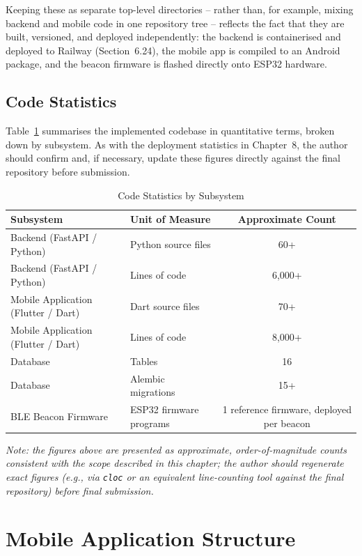 \documentclass[12pt, a4paper, oneside]{report}
\begin{document}
Keeping these as separate top-level directories -- rather than, for example, mixing backend and mobile code in one repository tree -- reflects the fact that they are built, versioned, and deployed independently: the backend is containerised and deployed to Railway (Section~6.24), the mobile app is compiled to an Android package, and the beacon firmware is flashed directly onto ESP32 hardware.

\subsection{Code Statistics}
\label{sec:code-stats}

Table~\ref{tab:code-stats} summarises the implemented codebase in quantitative terms, broken down by subsystem. As with the deployment statistics in Chapter~8, the author should confirm and, if necessary, update these figures directly against the final repository before submission.

\begin{table}[htbp]
\centering
\caption{Code Statistics by Subsystem}
\label{tab:code-stats}
\begin{tabularx}{\textwidth}{|X|X|c|}
\hline
\textbf{Subsystem} & \textbf{Unit of Measure} & \textbf{Approximate Count} \\
\hline
Backend (FastAPI / Python) & Python source files & 60+ \\
\hline
Backend (FastAPI / Python) & Lines of code & 6{,}000+ \\
\hline
Mobile Application (Flutter / Dart) & Dart source files & 70+ \\
\hline
Mobile Application (Flutter / Dart) & Lines of code & 8{,}000+ \\
\hline
Database & Tables & 16 \\
\hline
Database & Alembic migrations & 15+ \\
\hline
BLE Beacon Firmware & ESP32 firmware programs & 1 reference firmware, deployed per beacon \\
\hline
\end{tabularx}
\end{table}

\textit{Note: the figures above are presented as approximate, order-of-magnitude counts consistent with the scope described in this chapter; the author should regenerate exact figures (e.g., via \texttt{cloc} or an equivalent line-counting tool against the final repository) before final submission.}

\section{Mobile Application Structure}
\end{document}
